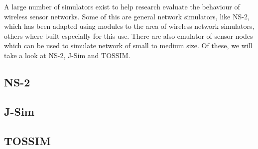 A large number of simulators exist to help research evaluate the behaviour of
wireless sensor networks. Some of this are general network simulators, like NS-2,
which has been adapted using modules to the area of wireless network simulators, others
where built especially for this use. There are also emulator of sensor nodes which can be
used to simulate network of small to medium size. Of these, we will take a look at NS-2, J-Sim
and TOSSIM.

\subsection{NS-2}

\subsection{J-Sim}

\subsection{TOSSIM}

